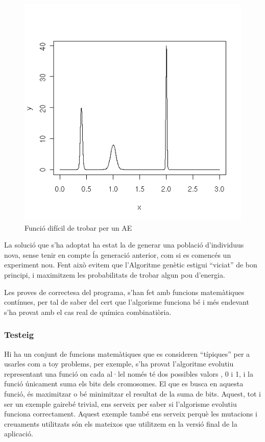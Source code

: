 \documentclass[titlepage,a4paper,12pt]{book}
\begin{document}
\begin{figure}[h]
	\begin{center}
		\includegraphics{chiron/pics.png}
	\end{center}
	\caption{Funció difícil de trobar per un AE}
	\label{fig:dificil}
\end{figure} 

La solució que s'ha adoptat ha estat la de generar una població d'individuus
nova, sense tenir en compte ĺa generació anterior, com si es comencés un
experiment nou.  Fent això evitem que l'Algoritme genètic estigui ``viciat'' de
bon principi, i maximitzem les probabilitats de trobar algun pou d'energia.

Les proves de correctesa del programa, s'han fet amb funcions matemàtiques
contínues, per tal de saber del cert que l'algorisme funciona bé i més endevant
s'ha provat amb el cas real de química combinatiòria.


\subsubsection{Testeig} %
\label{ssub:Testeig}

Hi ha un conjunt de funcions matemàtiques que es consideren ``típiques'' per a
usarles com a toy problems, per exemple, s'ha provat l'algoritme evolutiu
representant una funció on cada al·lel només té dos possibles valors , 0 i 1, i
la funció únicament suma els bits dels cromosomes.  El que es busca en aquesta
funció, és maximitzar o bé minimitzar el resultat de la suma de bits.  Aquest,
tot i ser un exemple gairebé trivial, ens serveix per saber si l'algorisme
evolutiu funciona correctament.  Aquest exemple també ens serveix perquè les
mutacions i creuaments utilitzats són els mateixos que utilitzem en la versió
final de la aplicació.
\end{document}
